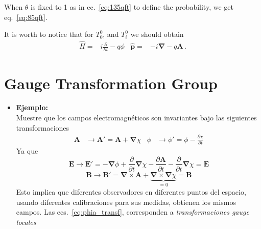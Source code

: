 When $\theta$ is fixed to 1 as in ec.~\eqref{eq:135qft} to define the probability, we get eq.~\eqref{eq:85qft}.

It is worth to notice that for $T^0_0$, and $T^0_i$ we should obtain
\begin{align}
  \widehat{H}=& i\frac{\partial}{\partial t}-q\phi & \widehat{\mathbf{p}}=&-i\boldsymbol{\nabla}-q\mathbf{A}\,.
\end{align}

\section{Gauge Transformation Group}
\begin{itemize}
\item \textbf{Ejemplo:}\\
Muestre que los campos electromagnéticos son invariantes bajo las siguientes transformaciones
\begin{align}
  \label{eq:phia_transf}
  \mathbf{A}&\to\mathbf{A}'=\mathbf{A}+\boldsymbol{\nabla}\chi&
  \phi&\to\phi'=\phi-\frac{\partial\chi}{\partial t} 
\end{align}
Ya que
\begin{equation}
  \label{eq:Etrans}
  \mathbf{E}\to\mathbf{E}'= -\boldsymbol{\nabla}\phi+\frac{\partial}{\partial t}\boldsymbol{\nabla}\chi
  -\frac{\partial\mathbf{A}}{\partial t}-\frac{\partial}{\partial t}\boldsymbol{\nabla}\chi=\mathbf{E}
\end{equation}
\begin{equation}
  \label{eq:btransf}
  \mathbf{B}\to\mathbf{B}'= \boldsymbol{\nabla}\times \mathbf{A}+
  \underbrace{\boldsymbol{\nabla}\times \boldsymbol{\nabla}\chi}_{\displaystyle =0}=\mathbf{B}
\end{equation}
Esto implica que diferentes observadores en diferentes puntos del espacio, usando diferentes calibraciones para sus medidas, obtienen los mismos campos. Las  ecs.~\eqref{eq:phia_transf}, corresponden a \emph{transformaciones gauge locales}

\end{itemize}

